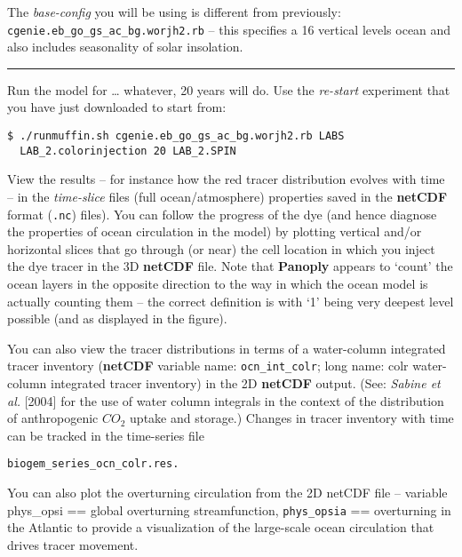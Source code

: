 \documentclass[11pt,fleqn]{book} %
\begin{document}
The \textit{base-config} you will be using is different from previously: \texttt{cgenie.eb\_go\_gs\_ac\_bg.worjh2.rb} – this specifies a 16 vertical levels ocean and also includes seasonality of solar insolation.

\hfill \break
\noindent\rule{4cm}{0.1mm}
\hfill \break

\noindent Run the model for … whatever, 20 years will do. Use the \textit{re-start} experiment that you have just downloaded to start from:

\vspace{-2mm}
\begin{verbatim}
$ ./runmuffin.sh cgenie.eb_go_gs_ac_bg.worjh2.rb LABS
  LAB_2.colorinjection 20 LAB_2.SPIN
\end{verbatim}
\vspace{-2mm}

View the results – for instance how the red tracer distribution evolves with time – in the \textit{time-slice} files (full ocean/atmosphere) properties saved in the \textbf{netCDF} format (\texttt{.nc}) files). You can follow the progress of the dye (and hence diagnose the properties of ocean circulation in the model) by plotting vertical and/or horizontal slices that go through (or near) the cell location in which you inject the dye tracer in the 3D \textbf{netCDF} file. Note that \textbf{Panoply} appears to ‘count’ the ocean layers in the opposite direction to the way in which the ocean model is actually counting them – the correct definition is with ‘1’ being very deepest level possible (and as displayed in the figure).

You can also view the tracer distributions in terms of a water-column integrated tracer inventory (\textbf{netCDF} variable name: \texttt{ocn\_int\_colr}; long name: colr water-column integrated tracer inventory) in the 2D \textbf{netCDF} output. (See: \textit{Sabine et al.} [2004] for the use of water column integrals in the context of the distribution of anthropogenic \(CO_{2}\) uptake and storage.) Changes in tracer inventory with time can be tracked in the time-series file

\vspace{-2mm}
\begin{verbatim}
biogem_series_ocn_colr.res.
\end{verbatim}
\vspace{-2mm}

You can also plot the overturning circulation from the 2D netCDF file – variable phys\_opsi == global overturning streamfunction, \texttt{phys\_opsia} == overturning in the Atlantic to provide a visualization of the large-scale ocean circulation that drives tracer movement.
\end{document}
